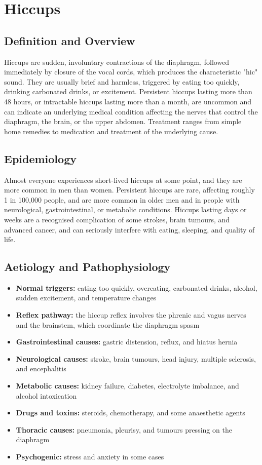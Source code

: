 \chapter{Hiccups}

\section*{Definition and Overview}
Hiccups are sudden, involuntary contractions of the diaphragm, followed immediately by closure of the vocal cords, which produces the characteristic "hic" sound. They are usually brief and harmless, triggered by eating too quickly, drinking carbonated drinks, or excitement. Persistent hiccups lasting more than 48 hours, or intractable hiccups lasting more than a month, are uncommon and can indicate an underlying medical condition affecting the nerves that control the diaphragm, the brain, or the upper abdomen. Treatment ranges from simple home remedies to medication and treatment of the underlying cause.

\section*{Epidemiology}
Almost everyone experiences short-lived hiccups at some point, and they are more common in men than women. Persistent hiccups are rare, affecting roughly 1 in 100,000 people, and are more common in older men and in people with neurological, gastrointestinal, or metabolic conditions. Hiccups lasting days or weeks are a recognised complication of some strokes, brain tumours, and advanced cancer, and can seriously interfere with eating, sleeping, and quality of life.

\section*{Aetiology and Pathophysiology}
\begin{itemize}
    \item \textbf{Normal triggers:} eating too quickly, overeating, carbonated drinks, alcohol, sudden excitement, and temperature changes
    \item \textbf{Reflex pathway:} the hiccup reflex involves the phrenic and vagus nerves and the brainstem, which coordinate the diaphragm spasm
    \item \textbf{Gastrointestinal causes:} gastric distension, reflux, and hiatus hernia
    \item \textbf{Neurological causes:} stroke, brain tumours, head injury, multiple sclerosis, and encephalitis
    \item \textbf{Metabolic causes:} kidney failure, diabetes, electrolyte imbalance, and alcohol intoxication
    \item \textbf{Drugs and toxins:} steroids, chemotherapy, and some anaesthetic agents
    \item \textbf{Thoracic causes:} pneumonia, pleurisy, and tumours pressing on the diaphragm
    \item \textbf{Psychogenic:} stress and anxiety in some cases
\end{itemize}


